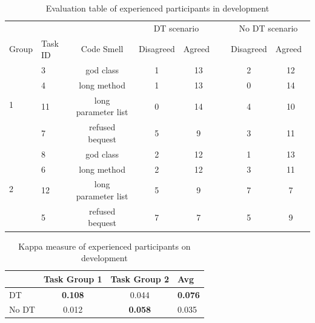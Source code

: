 \begin{table}[ht]
\centering
\begin{tabular}{llccclcc} 
\toprule
 &  & \multicolumn{1}{l}{} & \multicolumn{2}{c}{DT scenario} & \multicolumn{1}{c}{} & \multicolumn{2}{c}{No DT scenario} \\ 
\cmidrule{4-5}\cmidrule{7-8}
Group & Task ID & Code Smell & Disagreed & Agreed~ &  & \multicolumn{1}{l}{Disagreed} & \multicolumn{1}{l}{Agreed~} \\ 
\midrule
\multirow{4}{*}{1} & 3 & god class & 1 & 13 &  & 2 & 12 \\
 & 4 & long method & 1 & 13 &  & 0 & 14 \\
 & 11 & long parameter list & 0 & 14 &  & 4 & 10 \\
 & 7 & refused bequest & 5 & 9 &  & 3 & 11 \\ 
\midrule
\multirow{4}{*}{2} & 8 & god class & 2 & 12 &  & 1 & 13 \\
 & 6 & long method & 2 & 12 &  & 3 & 11 \\
 & 12 & long parameter list & 5 & 9 &  & 7 & 7 \\
 & 5 & refused bequest & 7 & 7 &  & 5 & 9 \\
\bottomrule
\end{tabular}
\caption{Evaluation table of experienced participants in development}
\label{tbl:developmentTableEvaluation}
\end{table}

\begin{table}[ht]
\centering
\setlength{\extrarowheight}{0pt}
\addtolength{\extrarowheight}{\aboverulesep}
\addtolength{\extrarowheight}{\belowrulesep}
\setlength{\aboverulesep}{0pt}
\setlength{\belowrulesep}{0pt}
\begin{tabular}{lccl} 
\toprule
 & \multicolumn{1}{l}{Task Group 1} & \multicolumn{1}{l}{Task Group 2} & {\cellcolor[rgb]{0.753,0.753,0.753}}Avg \\ 
\midrule
DT & \textbf{0.108} & 0.044 & {\cellcolor[rgb]{0.753,0.753,0.753}}\textbf{0.076} \\
No DT & 0.012 & \textbf{0.058} & {\cellcolor[rgb]{0.753,0.753,0.753}}0.035 \\
\bottomrule
\end{tabular}
\caption{Kappa measure of experienced participants on development}
\label{tbl:developmentKappaValues}
\end{table}

